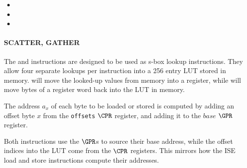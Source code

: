 \begin{itemize}
\item {}
\item {}
\item {}
\end{itemize}


\paragraph{SCATTER, GATHER}

The  and  instructions are designed to be used as
s-box lookup instructions. They allow four separate lookups per instruction
into a 256 entry LUT stored in memory.  will move the looked-up
values from memory into a register, while  will move bytes of a
register word back into the LUT in memory.

The address $a_x$ of each byte to be loaded or stored is computed by
adding an offset byte $x$ from the {\tt offsets} $\CPR$ register, and
adding it to the $base$ $\GPR$ register.

Both instructions use the $\GPR$s to source their base address, while the
offset indices into the LUT come from the $\CPR$ registers. This mirrors
how the ISE load and store instructions compute their addresses.

